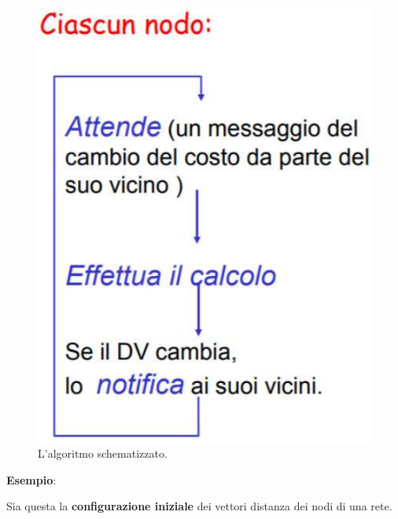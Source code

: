 \documentclass[11pt,a4paper,oneside]{book}
\theoremstyle{definition}
\begin{document}
\begin{figure}[!h]
	\includegraphics[scale=0.24]{Immagini/DV_al.png}
	\centering
	\caption{L'algoritmo schematizzato.}
\end{figure}

\pagebreak

\begin{flushleft}
	\textbf{Esempio}:
\end{flushleft}

Sia questa la \textbf{configurazione iniziale} dei vettori distanza dei nodi di una rete.
\end{document}
